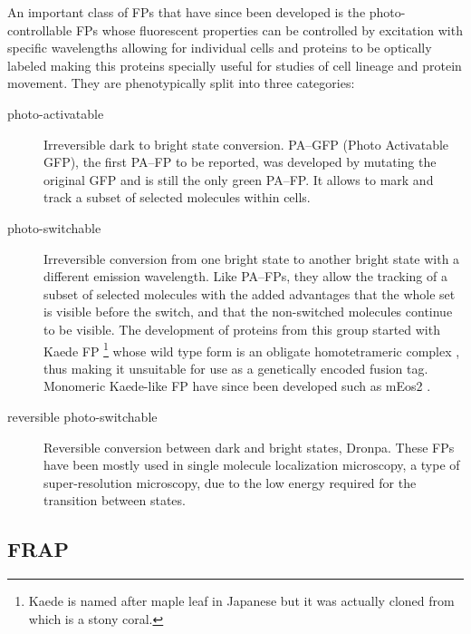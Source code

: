     An important class of FPs that have since been developed is the
    photo-controllable FPs whose
    fluorescent properties can be controlled by excitation with specific
    wavelengths allowing for individual cells and proteins to be optically
    labeled making this proteins specially useful for studies of cell
    lineage and protein movement.
    They are phenotypically split into three categories:

    \begin{description}
      \item[photo-activatable]
        Irreversible dark to bright state conversion.
        PA--GFP (Photo Activatable GFP), the first PA--FP to be
        reported, was developed by mutating the original GFP
        \citep{pagfp-discovery} and is
        still the only green PA--FP.
        It allows to mark and track a subset of selected molecules
        within cells.

      \item[photo-switchable]
        Irreversible conversion from one bright state to another bright
        state with a different emission wavelength.
        Like PA--FPs, they allow the tracking of a subset of selected
        molecules with the added advantages that the whole set is visible
        before the switch, and that the non-switched molecules continue
        to be visible.
        The development of proteins from this group started with Kaede FP
        \footnote{Kaede is named after maple leaf in Japanese but it was
        actually cloned from  which is a
        stony coral.} whose wild type form is an obligate homotetrameric
        complex \citep{kaede-discovery}, thus making it
        unsuitable for use as a genetically encoded fusion tag.
        Monomeric Kaede-like FP have since been developed such as
        mEos2 \citep{meos2-discovery}.

      \item[reversible photo-switchable]
        Reversible conversion between dark and bright states, \eg Dronpa.
        These FPs have been mostly used in single molecule localization
        microscopy, a type of super-resolution microscopy, due to the
        low energy required for the transition between states.

    \end{description}


  \subsection{FRAP}

